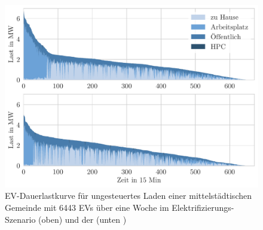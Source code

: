 \begin{figure}[H]
    \centering
    \includegraphics[width=\textwidth]{Bilder/example_load_duration_curve}
    \caption{EV-Dauerlastkurve für ungesteuertes Laden einer mittelstädtischen Gemeinde mit \num{6443} \glspl{EV} über eine Woche im Elektrifizierungs-Szenario (oben) und der \SzeFirmenparkplatz (unten
    )}\label{fig:example_load_curve}
\end{figure}